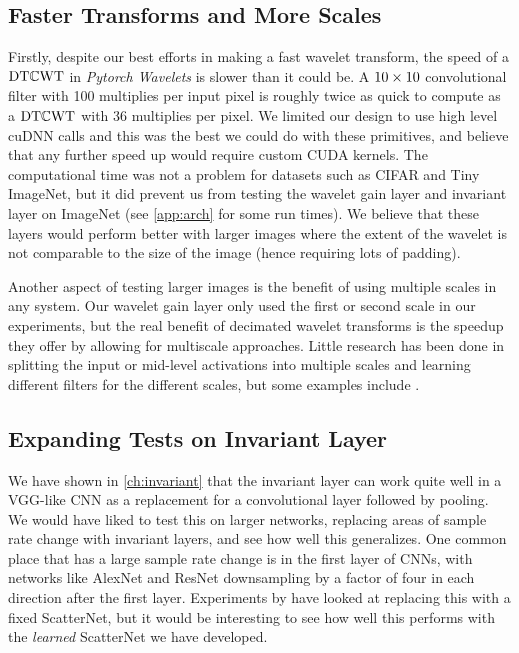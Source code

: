 \subsection{Faster Transforms and More Scales}
Firstly, despite our best efforts in making a fast wavelet transform, the speed
of a $\mathrm{DT}\mathbb{C}\mathrm{WT}$ in \emph{Pytorch Wavelets} is slower than it could be. A $10\times 10$
convolutional filter with 100 multiplies per input pixel is roughly twice as
quick to compute as a $\mathrm{DT}\mathbb{C}\mathrm{WT}$ with 36 multiplies per pixel. We limited our
design to use high level cuDNN calls and this was the best we could do with
these primitives, and believe that any further speed up would require custom CUDA
kernels. The computational time was not a problem for datasets such as CIFAR and Tiny
ImageNet, but it did prevent us from testing the wavelet gain layer and
invariant layer on ImageNet (see \autoref{app:arch} for some run times).
We believe that these layers would perform better with larger images where the
extent of the wavelet is not comparable to the size of the image (hence
requiring lots of padding).

Another aspect of testing larger images is the benefit of using multiple
scales in any system. Our wavelet gain layer only used the first or second scale
in our experiments, but the real benefit of decimated wavelet transforms is the
speedup they offer by allowing for multiscale approaches. Little research has
been done in splitting the input or mid-level activations into multiple scales
and learning different filters for the different scales, but some examples
include \cite{haber_learning_2017, fujieda_wavelet_2018}.

\subsection{Expanding Tests on Invariant Layer}
We have shown in \autoref{ch:invariant} that the invariant layer can work quite
well in a VGG-like CNN as a replacement for a convolutional layer followed by 
pooling. We would have liked to test this on larger networks, replacing areas of
sample rate change with invariant layers, and see how well
this generalizes. One common place that has a large sample rate change is in the first layer of 
CNNs, with networks like AlexNet and ResNet downsampling by a
factor of four in each direction after the first layer. Experiments by
\cite{oyallon_scaling_2017} have looked at replacing this with a fixed
ScatterNet, but it would be interesting to see how well this performs with the
\emph{learned} ScatterNet we have developed.

